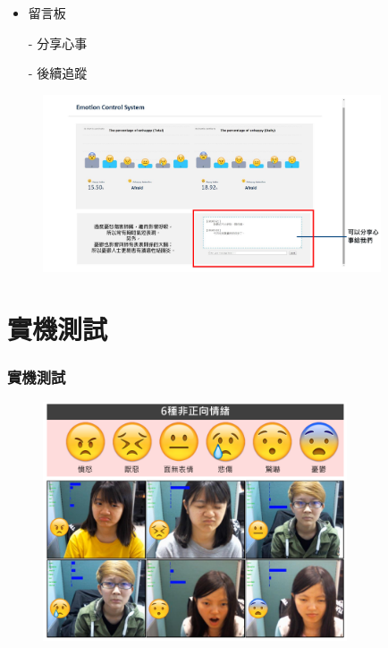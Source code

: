 \documentclass[10pt, conference, compsocconf]{beamer}
\begin{document}
\begin{CJK}{UTF8}{}
\begin{frame}
\vspace{-10mm}
\begin{itemize}
\item \Large 留言板
\end{itemize}
\begin{itemize}
\item[-]  分享心事
\item[-]  後續追蹤
\end{itemize}

\begin{figure}[!t]
\begin{center}
\includegraphics[width=10cm]{./Figures/web8.pdf}
\end{center}
\end{figure}

\end{frame}

\section{實機測試}

\begin{frame}
\frametitle{實機測試}

\begin{figure}[t]
\begin{center}
\includegraphics[width=9cm]{./Figures/6Emotion.pdf}
\end{center}
\end{figure}


\end{frame}
\end{CJK}
\end{document}
